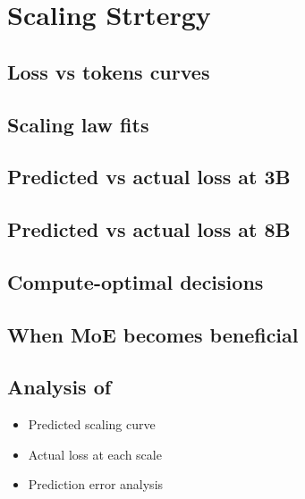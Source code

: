 \section{Scaling Strtergy}
    \subsection{Loss vs tokens curves}
    \subsection{Scaling law fits}
    \subsection{Predicted vs actual loss at 3B}
    \subsection{Predicted vs actual loss at 8B}
    \subsection{Compute-optimal decisions}
    \subsection{When MoE becomes beneficial}
    \subsection{Analysis of }
    \begin{itemize}
        \item Predicted scaling curve
        \item Actual loss at each scale
        \item Prediction error analysis
    \end{itemize}
